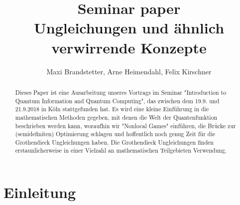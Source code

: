 

\title{Seminar paper \\ Ungleichungen und ähnlich verwirrende Konzepte}
\author{Maxi Brandstetter, Arne Heimendahl, Felix Kirschner}





\begin{abstract}
Dieses Paper ist eine Ausarbeitung unseres Vortrags im Seminar "Introduction to Quantum Information and Quantum Computing", das zwischen dem 19.9. und 21.9.2018 in Köln stattgefunden hat. Es wird eine kleine Einführung in die mathematischen Methoden gegeben, mit denen die Welt der Quantenfunktion beschrieben werden kann, woraufhin wir "Nonlocal Games" einführen, die Brücke zur (semidefiniten) Optimierung schlagen und hoffentlich noch genug Zeit für die Grothendieck Ungleichungen haben. Die Grothendieck Ungleichungen finden erstaunlicherweise in einer Vielzahl an mathematischen Teilgebieten Verwendung.
\end{abstract}


\maketitle	
\tableofcontents
	
	
\newpage	
{}



\section{Einleitung}
	\vspace{8pt}
	


\let \oldsection \section
\renewcommand{\section}{\vspace{15pt plus 8pt}\oldsection}
\let \oldsubsection \subsection
\renewcommand{\subsection}{\vspace{10pt plus 3pt}\oldsubsection}



